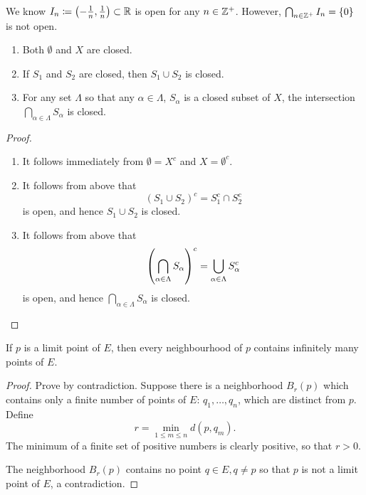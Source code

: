 \begin{example}
We know $I_n\coloneqq\left(-\frac{1}{n},\frac{1}{n}\right)\subset\mathbb R$ is open for any $n\in\mathbb Z^+$. However, $\bigcap_{n\in\mathbb Z^+}I_n=\{0\}$ is not open.
\end{example}

\begin{proposition}
\begin{enumerate}[label=(\arabic*)]
\item Both $\emptyset$ and $X$ are closed.
\item If $S_1$ and $S_2$ are closed, then $S_1\cup S_2$ is closed.
\item For any set $\Lambda$ so that any $\alpha\in\Lambda$, $S_\alpha$ is a closed subset of $X$, the intersection $\bigcap_{\alpha\in\Lambda}S_\alpha$ is closed.
\end{enumerate}
\end{proposition}

\begin{proof} \
\begin{enumerate}[label=(\arabic*)]
\item It follows immediately from $\emptyset=X^c$ and $X=\emptyset^c$.
\item It follows from above that
\[ (S_1\cup S_2)^c=S_1^c\cap S_2^c \]
is open, and hence $S_1\cup S_2$ is closed.
\item It follows from above that
\[ \left(\bigcap_{\alpha\in\Lambda}S_\alpha\right)^c=\bigcup_{\alpha\in\Lambda}S_\alpha^c \]
is open, and hence $\bigcap_{\alpha\in\Lambda}S_\alpha$ is closed.
\end{enumerate}
\end{proof}

\begin{proposition}
If $p$ is a limit point of $E$, then every neighbourhood of $p$ contains infinitely many points of $E$.
\end{proposition}

\begin{proof}
Prove by contradiction. Suppose there is a neighborhood $B_r(p)$ which contains only a finite number of points of $E$: $q_1,\dots,q_n$, which are distinct from $p$. Define
\[ r=\min_{1\le m\le n} d(p,q_m). \]
The minimum of a finite set of positive numbers is clearly positive, so that $r>0$.

The neighborhood $B_r(p)$ contains no point $q\in E,q\neq p$ so that $p$ is not a limit point of $E$, a contradiction.
\end{proof}


